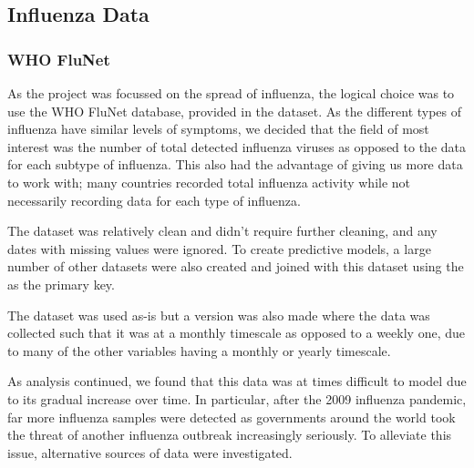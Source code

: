 \documentclass[letterpaper,10pt,english]{sphinxmanual}
\begin{document}
\subsection{Influenza Data}
\label{\detokenize{datasets:influenza-data}}

\subsubsection{WHO FluNet}
\label{\detokenize{datasets:who-flunet}}
As the project was focussed on the spread of influenza, the logical choice was to use the WHO FluNet database, provided in the  dataset. As the different types of influenza have similar levels of symptoms, we decided that the field of most interest was the number of total detected influenza viruses as opposed to the data for each subtype of influenza. This also had the advantage of giving us more data to work with; many countries recorded total influenza activity while not necessarily recording data for each type of influenza.

The dataset was relatively clean and didn’t require further cleaning, and any dates with missing values were ignored. To create predictive models, a large number of other datasets were also created and joined with this dataset using the  as the primary key.

The dataset was used as-is but a version was also made where the data was collected such that it was at a monthly timescale as opposed to a weekly one, due to many of the other variables having a monthly or yearly timescale.

As analysis continued, we found that this data was at times difficult to model due to its gradual increase over time. In particular, after the 2009 influenza pandemic, far more influenza samples were detected as governments around the world took the threat of another influenza outbreak increasingly seriously. To alleviate this issue, alternative sources of data were investigated.
\end{document}

